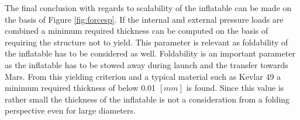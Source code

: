 The final conclusion with regards to scalability of the inflatable can be made on the basis of Figure \ref{fig:forcesp}. If the internal and external pressure loads are combined a minimum required thickness can be computed on the basis of requiring the structure not to yield. This parameter is relevant as foldability of the inflatable has to be considered as well. Foldability is an important parameter as the inflatable has to be stowed away during launch and the transfer towards Mars. From this yielding criterion and a typical material such as Kevlar 49 a minimum required thickness of below 0.01 $[mm]$ is found. Since this value is rather small the thickness of the inflatable is not a consideration from a folding perspective even for large diameters.